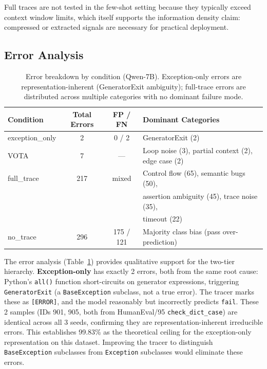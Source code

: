 \documentclass[11pt]{article}
\begin{document}
Full traces are not tested in the few-shot setting because they typically exceed context window limits, which itself supports the information density claim: compressed or extracted signals are necessary for practical deployment.

\subsection{Error Analysis}
\label{sec:errors}

\begin{table}[t]
\centering
\caption{Error breakdown by condition (Qwen-7B). Exception-only errors are representation-inherent (GeneratorExit ambiguity); full-trace errors are distributed across multiple categories with no dominant failure mode.}
\label{tab:errors}
\small
\begin{tabular}{lccl}
\toprule
\textbf{Condition} & \textbf{Total Errors} & \textbf{FP / FN} & \textbf{Dominant Categories} \\
\midrule
exception\_only & 2 & 0 / 2 & GeneratorExit (2) \\
VOTA & 7 & --- & Loop noise (3), partial context (2), edge case (2) \\
full\_trace & 217 & mixed & Control flow (65), semantic bugs (50), \\
 & & & assertion ambiguity (45), trace noise (35), \\
 & & & timeout (22) \\
no\_trace & 296 & 175 / 121 & Majority class bias (pass over-prediction) \\
\bottomrule
\end{tabular}
\end{table}

The error analysis (Table~\ref{tab:errors}) provides qualitative support for the two-tier hierarchy. \textbf{Exception-only} has exactly 2 errors, both from the same root cause: Python's \texttt{all()} function short-circuits on generator expressions, triggering \texttt{GeneratorExit} (a \texttt{BaseException} subclass, not a true error). The tracer marks these as \texttt{[ERROR]}, and the model reasonably but incorrectly predicts \texttt{fail}. These 2 samples (IDs 901, 905, both from HumanEval/95 \texttt{check\_dict\_case}) are identical across all 3 seeds, confirming they are representation-inherent irreducible errors. This establishes 99.83\% as the theoretical ceiling for the exception-only representation on this dataset. Improving the tracer to distinguish \texttt{BaseException} subclasses from \texttt{Exception} subclasses would eliminate these errors.
\end{document}
